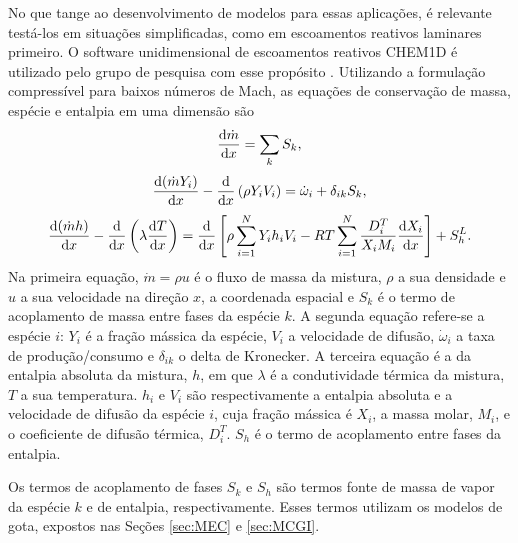 No que tange ao desenvolvimento de modelos para essas aplicações, é relevante testá-los em situações simplificadas, como em escoamentos reativos laminares primeiro.
O software unidimensional de escoamentos reativos CHEM1D \cite{Sommers1994PhD} é utilizado pelo grupo de pesquisa com esse propósito \cite{SacomanoF2018CTM,SacomanoF2019IJHMT,SacomanoF2021Fluids,SacomanoF2024CF,SacomanoF2025CF}.
Utilizando a formulação compressível para baixos números de Mach, as equações de conservação de massa, espécie e entalpia em uma dimensão 
\cite{SacomanoF2018CTM,SacomanoF2021Fluids,vanOijen2002CTM,vanOijen2016PECS}
são
\begin{equation}
    \frac{\mathrm{d} \dot m}{\mathrm{d} x} = \sum_k S_k,
\end{equation}
\begin{equation}
    \frac{\mathrm{d}(\dot m Y_i)}{\mathrm{d} x} -
    \frac{\mathrm{d}}{\mathrm{d} x} \left(
        \rho Y_i V_i
    \right) =
    \dot \omega_i + \delta_{ik} S_k,
\end{equation}
\begin{equation}
    \frac{\diff(\dot m h)}{\diff x}
    -
    \frac{\diff}{\diff x} 
        \left(
        \lambda %
        \frac{\diff T}{\diff x} 
        \right)
    =
    \frac{\diff}{\diff x}
    \left[
        \rho \sum_{i=1}^N Y_i h_i V_i
        - R T \sum_{i=1}^N \frac{D_i^T}{X_i M_i}
        \frac{\diff X_i}{\diff x}
    \right]
    +
    S_h^L.
\end{equation}
Na primeira equação, $\dot m = \rho u$ é o fluxo de massa da mistura, $\rho$ a sua densidade e $u$ a sua velocidade na direção $x$, a coordenada espacial e $S_k$ é o termo de acoplamento de massa entre fases da espécie $k$.
A segunda equação refere-se a espécie $i$: $Y_i$ é a fração mássica da espécie, $V_i$ a velocidade de difusão, $\dot \omega_i$ a taxa de produção/consumo e $\delta_{ik}$ o delta de Kronecker. 
A terceira equação é a da entalpia absoluta da mistura, $h$, em que $\lambda$ é a condutividade térmica da mistura, $T$ a sua temperatura. 
$h_i$ e $V_i$ são respectivamente a entalpia absoluta e a velocidade de difusão da espécie $i$, cuja fração mássica é $X_i$, a massa molar, $M_i$, e o coeficiente de difusão térmica, $D_i^T$.
$S_h$ é o termo de acoplamento entre fases da entalpia.

Os termos de acoplamento de fases $S_k$ e $S_h$ são termos fonte de massa de vapor da espécie $k$ e de entalpia, respectivamente.
Esses termos utilizam os modelos de gota, expostos nas Seções \ref{sec:MEC} e \ref{sec:MCGI}.

